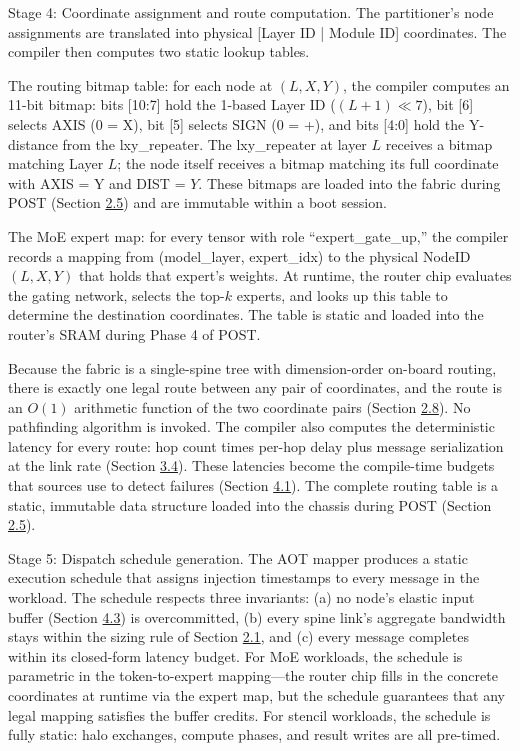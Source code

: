 \documentclass[10pt,twocolumn]{article}
\begin{document}
Stage 4: Coordinate assignment and route computation. The partitioner's node assignments are translated into physical [Layer ID | Module ID] coordinates. The compiler then computes two static lookup tables.

The routing bitmap table: for each node at $(L, X, Y)$, the compiler computes an 11-bit bitmap: bits [10:7] hold the 1-based Layer ID ($(L+1) \ll 7$), bit [6] selects AXIS (0 = X), bit [5] selects SIGN (0 = +), and bits [4:0] hold the Y-distance from the lxy\_repeater. The lxy\_repeater at layer $L$ receives a bitmap matching Layer $L$; the node itself receives a bitmap matching its full coordinate with AXIS = Y and DIST = $Y$. These bitmaps are loaded into the fabric during POST (Section \hyperref[sec:2.5]{2.5}) and are immutable within a boot session.

The MoE expert map: for every tensor with role ``expert\_gate\_up,'' the compiler records a mapping from (model\_layer, expert\_idx) to the physical NodeID $(L, X, Y)$ that holds that expert's weights. At runtime, the router chip evaluates the gating network, selects the top-$k$ experts, and looks up this table to determine the destination coordinates. The table is static and loaded into the router's SRAM during Phase 4 of POST.

Because the fabric is a single-spine tree with dimension-order on-board routing, there is exactly one legal route between any pair of coordinates, and the route is an $O(1)$ arithmetic function of the two coordinate pairs (Section \hyperref[sec:2.8]{2.8}). No pathfinding algorithm is invoked. The compiler also computes the deterministic latency for every route: hop count times per-hop delay plus message serialization at the link rate (Section \hyperref[sec:3.4]{3.4}). These latencies become the compile-time budgets that sources use to detect failures (Section \hyperref[sec:4.1]{4.1}). The complete routing table is a static, immutable data structure loaded into the chassis during POST (Section \hyperref[sec:2.5]{2.5}).

Stage 5: Dispatch schedule generation. The AOT mapper produces a static execution schedule that assigns injection timestamps to every message in the workload. The schedule respects three invariants: (a) no node's elastic input buffer (Section \hyperref[sec:4.3]{4.3}) is overcommitted, (b) every spine link's aggregate bandwidth stays within the sizing rule of Section \hyperref[sec:2.1]{2.1}, and (c) every message completes within its closed-form latency budget. For MoE workloads, the schedule is parametric in the token-to-expert mapping---the router chip fills in the concrete coordinates at runtime via the expert map, but the schedule guarantees that any legal mapping satisfies the buffer credits. For stencil workloads, the schedule is fully static: halo exchanges, compute phases, and result writes are all pre-timed.
\end{document}
